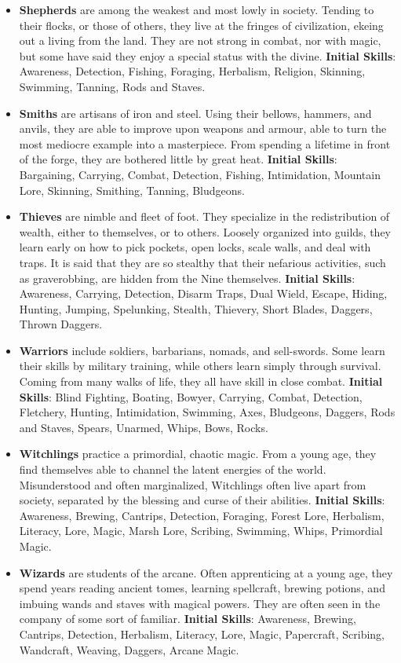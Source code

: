 \begin{itemize}
\item {\bf Shepherds} are among the weakest and most lowly in society.  
Tending to their flocks, or those of others, they live at the fringes of 
civilization, ekeing out a living from the land.  They are not strong in 
combat, nor with magic, but some have said they enjoy a special status 
with the divine.  \textbf{Initial Skills}: Awareness, Detection, Fishing,
Foraging, Herbalism, Religion, Skinning, Swimming, Tanning, Rods and 
Staves.

\item {\bf Smiths} are artisans of iron and steel.  Using their bellows, 
hammers, and anvils, they are able to improve upon weapons and armour, 
able to turn the most mediocre example into a masterpiece.  From spending 
a lifetime in front of the forge, they are bothered little by great heat.
\textbf{Initial Skills}: Bargaining, Carrying, Combat, Detection, 
Fishing, Intimidation, Mountain Lore, Skinning, Smithing, Tanning,
Bludgeons.

\item {\bf Thieves} are nimble and fleet of foot.  They specialize in the 
redistribution of wealth, either to themselves, or to others.  Loosely 
organized into guilds, they learn early on how to pick pockets, open 
locks, scale walls, and deal with traps.  It is said that they are so
stealthy that their nefarious activities, such as graverobbing, are hidden
from the Nine themselves.  \textbf{Initial Skills}: Awareness, Carrying, 
Detection, Disarm Traps, Dual Wield, Escape, Hiding, Hunting, Jumping, 
Spelunking, Stealth, Thievery, Short Blades, Daggers, Thrown Daggers.

\item {\bf Warriors} include soldiers, barbarians, nomads, and sell-swords.
Some learn their skills by military training, while others learn simply 
through survival.  Coming from many walks of life, they all have skill in 
close combat.  \textbf{Initial Skills}: Blind Fighting, Boating, Bowyer,
Carrying, Combat, Detection, Fletchery, Hunting, Intimidation, Swimming,
Axes, Bludgeons, Daggers, Rods and Staves, Spears, Unarmed, Whips, Bows,
Rocks.

\item {\bf Witchlings} practice a primordial, chaotic magic.  From a young 
age, they find themselves able to channel the latent energies of the 
world.  Misunderstood and often marginalized, Witchlings often live apart 
from society, separated by the blessing and curse of their abilities.
\textbf{Initial Skills}: Awareness, Brewing, Cantrips, Detection, Foraging,
Forest Lore, Herbalism, Literacy, Lore, Magic, Marsh Lore, Scribing,
Swimming, Whips, Primordial Magic.

\item {\bf Wizards} are students of the arcane.  Often apprenticing at a 
young age, they spend years reading ancient tomes, learning spellcraft, 
brewing potions, and imbuing wands and staves with magical powers.  They 
are often seen in the company of some sort of familiar.
\textbf{Initial Skills}: Awareness, Brewing, Cantrips, Detection,
Herbalism, Literacy, Lore, Magic, Papercraft, Scribing, Wandcraft, Weaving, 
Daggers, Arcane Magic.
\end{itemize}

